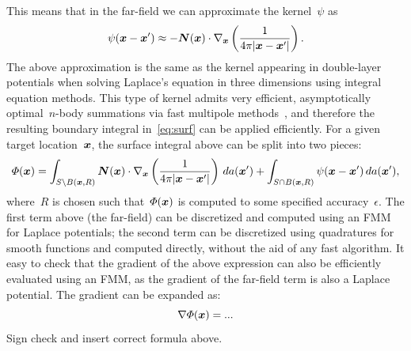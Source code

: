 \documentclass[11pt]{article}
\numberwithin{equation}{section}
\newcommand{\vct}{\vectorsym}
\DeclareMathOperator\erf{Erf}
\newcommand\bx{\vct{x}}
\newcommand\by{\vct{y}}
\newcommand\bn{\boldsymbol n}
\begin{document}
This means that in the far-field we can approximate the kernel~$\psi$ as
\begin{equation}
  \psi(\bx-\bx') \approx -\vct{N}(\bx) \cdot \nabla_{\bx} \left(
    \frac{1}{4\pi |\bx-\bx'| }\right).
\end{equation}
The above approximation is the same as the kernel appearing in
double-layer potentials when solving Laplace's equation in three
dimensions using integral equation methods. This type of kernel admits
very efficient, asymptotically optimal~$n$-body summations via fast
multipole methods~\cite{many}, and therefore the resulting boundary
integral in~\eqref{eq:surf} can be applied efficiently.
For a given target location~$\bx$, the surface integral above can be
split into two pieces:
\begin{equation}
  \Phi(\bx) = \int_{S\setminus B(\bx,R)} \vct{N}(\bx) \cdot \nabla_{\bx} \left(
    \frac{1}{4\pi |\bx-\bx'| }\right) \, da(\bx') +
  \int_{S \cap B(\bx,R)} \psi(\bx-\bx') \, da(\bx'),
\end{equation}
where~$R$ is chosen such that~$\Phi(\bx)$ is computed to some
specified accuracy~$\epsilon$. The first term above (the far-field)
can be discretized and computed using an FMM for Laplace potentials;
the second term can be discretized using quadratures for smooth
functions and computed directly, without the aid of any fast algorithm.
It easy to check that the gradient of the above expression can also be
efficiently evaluated using an FMM, as the gradient of the far-field
term is also a Laplace potential. The gradient can be expanded as:
\begin{equation}\label{eq:surfgrad}
    \nabla \Phi(\bx) =  ...
\end{equation}
{\color{red} Sign check and insert correct formula above.}
\end{document}
